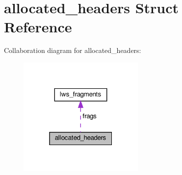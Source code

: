 \hypertarget{structallocated__headers}{}\section{allocated\+\_\+headers Struct Reference}
\label{structallocated__headers}


Collaboration diagram for allocated\+\_\+headers\+:
\nopagebreak
\begin{figure}[H]
\begin{center}
\leavevmode
\includegraphics[width=175pt]{structallocated__headers__coll__graph}
\end{center}
\end{figure}
